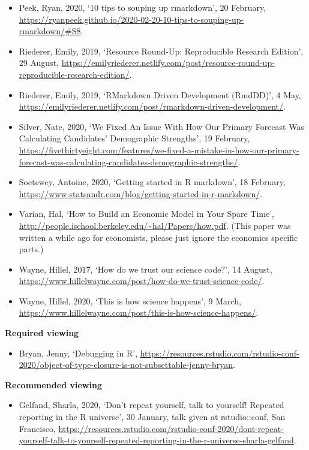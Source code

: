 \documentclass[
]{book}
\providecommand{\tightlist}{%
  \setlength{\itemsep}{0pt}\setlength{\parskip}{0pt}}
\begin{document}
\begin{itemize}
\item
  Peek, Ryan, 2020, `10 tips to souping up rmarkdown', 20 February, \url{https://ryanpeek.github.io/2020-02-20-10-tips-to-souping-up-rmarkdown/\#S8}.
\item
  Riederer, Emily, 2019, `Resource Round-Up: Reproducible Research Edition', 29 August, \url{https://emilyriederer.netlify.com/post/resource-round-up-reproducible-research-edition/}.
\item
  Riederer, Emily, 2019, `RMarkdown Driven Development (RmdDD)', 4 May, \url{https://emilyriederer.netlify.com/post/rmarkdown-driven-development/}.
\item
  Silver, Nate, 2020, `We Fixed An Issue With How Our Primary Forecast Was Calculating Candidates' Demographic Strengths', 19 February, \url{https://fivethirtyeight.com/features/we-fixed-a-mistake-in-how-our-primary-forecast-was-calculating-candidates-demographic-strengths/}.
\item
  Soetewey, Antoine, 2020, `Getting started in R markdown', 18 February, \url{https://www.statsandr.com/blog/getting-started-in-r-markdown/}.
\item
  Varian, Hal, `How to Build an Economic Model in Your Spare Time', \url{http://people.ischool.berkeley.edu/~hal/Papers/how.pdf}. (This paper was written a while ago for economists, please just ignore the economics specific parts.)
\item
  Wayne, Hillel, 2017, `How do we trust our science code?', 14 August, \url{https://www.hillelwayne.com/post/how-do-we-trust-science-code/}.
\item
  Wayne, Hillel, 2020, `This is how science happens', 9 March, \url{https://www.hillelwayne.com/post/this-is-how-science-happens/}.
\end{itemize}

\textbf{Required viewing}

\begin{itemize}
\tightlist
\item
  Bryan, Jenny, `Debugging in R', \url{https://resources.rstudio.com/rstudio-conf-2020/object-of-type-closure-is-not-subsettable-jenny-bryan}.
\end{itemize}

\textbf{Recommended viewing}

\begin{itemize}
\tightlist
\item
  Gelfand, Sharla, 2020, `Don't repeat yourself, talk to yourself! Repeated reporting in the R universe', 30 January, talk given at rstudio::conf, San Francisco, \url{https://resources.rstudio.com/rstudio-conf-2020/dont-repeat-yourself-talk-to-yourself-repeated-reporting-in-the-r-universe-sharla-gelfand}.
\end{itemize}
\end{document}
